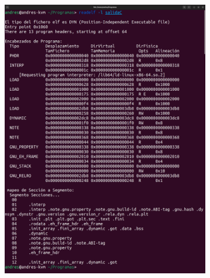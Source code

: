 \documentclass{article}
\begin{document}
\begin{itemize}
    \begin{figure}[H]
        \centering
        \begin{subfigure}{0.49\textwidth}
            \centering
            \includegraphics[width=\textwidth]{imagenes/mergedelfl.png}
        \end{subfigure}
        \hfill
        \begin{subfigure}{0.49\textwidth}
            \centering

\end{subfigure}
\end{figure}
\end{itemize}
\end{document}
